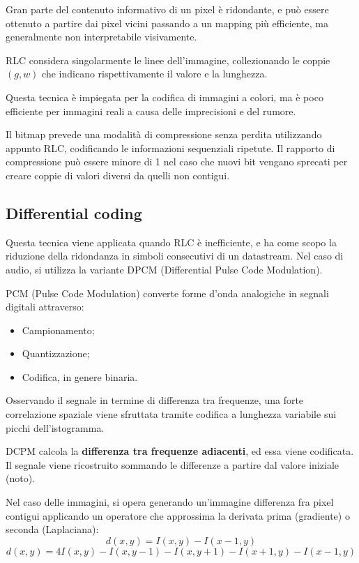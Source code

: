 Gran parte del contenuto informativo di un pixel è ridondante, e può essere ottenuto a partire dai pixel vicini passando a un mapping più efficiente, ma generalmente non interpretabile visivamente. 

RLC considera singolarmente le linee dell'immagine, collezionando le coppie $(g, w)$ che indicano rispettivamente il valore e la lunghezza.

Questa tecnica è impiegata per la codifica di immagini a colori, ma è poco efficiente per immagini reali a causa delle imprecisioni e del rumore. 

Il bitmap prevede una modalità di compressione senza perdita utilizzando appunto RLC, codificando le informazioni sequenziali ripetute. Il rapporto di compressione può essere minore di 1 nel caso che nuovi bit vengano sprecati per creare coppie di valori diversi da quelli non contigui.

\subsection{Differential coding}
Questa tecnica viene applicata quando RLC è inefficiente, e ha come scopo la riduzione della ridondanza in simboli consecutivi di un datastream. Nel caso di audio, si utilizza la variante DPCM (Differential Pulse Code Modulation).

PCM (Pulse Code Modulation) converte forme d'onda analogiche in segnali digitali attraverso:
\begin{itemize}
	\item Campionamento;
	\item Quantizzazione;
	\item Codifica, in genere binaria.
\end{itemize}

Osservando il segnale in termine di differenza tra frequenze, una forte correlazione spaziale viene sfruttata tramite codifica a lunghezza variabile sui picchi dell'istogramma.

DCPM calcola la \textbf{differenza tra frequenze adiacenti}, ed essa viene codificata. Il segnale viene ricostruito sommando le differenze a partire dal valore iniziale (noto).

Nel caso delle immagini, si opera generando un'immagine differenza fra pixel contigui applicando un operatore che approssima la derivata prima (gradiente) o seconda (Laplaciana):
$$d(x, y) = I(x, y) - I(x - 1, y)$$
$$d(x, y) = 4I(x, y) - I(x, y - 1) - I(x, y + 1) - I(x + 1, y) - I(x - 1, y)$$

